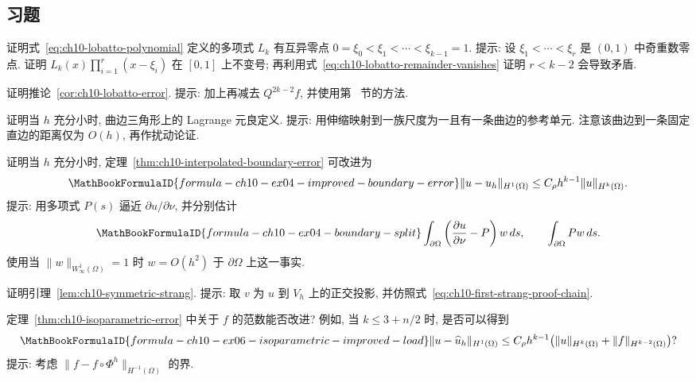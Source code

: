 \subsection{习题}
\label{sec:ch10-exercises}
\setcounter{exerciseitem}{0}

\begin{MBExercise}
\label{exr:ch10-01}
证明式~\eqref{eq:ch10-lobatto-polynomial} 定义的多项式 $L_k$ 有互异零点 $0=\xi_0<\xi_1<\cdots<\xi_{k-1}=1$. 提示: 设 $\xi_1<\cdots<\xi_r$ 是 $(0,1)$ 中奇重数零点. 证明 $L_k(x)\prod_{i=1}^r(x-\xi_i)$ 在 $[0,1]$ 上不变号; 再利用式~\eqref{eq:ch10-lobatto-remainder-vanishes} 证明 $r<k-2$ 会导致矛盾.
\end{MBExercise}

\begin{MBExercise}
\label{exr:ch10-02}
证明推论~\ref{cor:ch10-lobatto-error}. 提示: 加上再减去 $Q^{2k-2}f$, 并使用第~ 节的方法.
\end{MBExercise}

\begin{MBExercise}
\label{exr:ch10-03}
证明当 $h$ 充分小时, 曲边三角形上的 Lagrange 元良定义. 提示: 用伸缩映射到一族尺度为一且有一条曲边的参考单元. 注意该曲边到一条固定直边的距离仅为 $O(h)$, 再作扰动论证.
\end{MBExercise}

\begin{MBExercise}
\label{exr:ch10-04}
证明当 $h$ 充分小时, 定理~\ref{thm:ch10-interpolated-boundary-error} 可改进为
\[
\MathBookFormulaID{formula-ch10-ex04-improved-boundary-error}
\|u-u_h\|_{H^1(\Omega)}\leq C_\rho h^{k-1}\|u\|_{H^k(\Omega)}.
\]
提示: 用多项式 $P(s)$ 逼近 $\partial u/\partial\nu$, 并分别估计
\[
\MathBookFormulaID{formula-ch10-ex04-boundary-split}
\int_{\partial\Omega}\left(\frac{\partial u}{\partial\nu}-P\right)w\,ds,
\qquad
\int_{\partial\Omega}Pw\,ds.
\]
使用当 $\|w\|_{W_\infty^1(\Omega)}=1$ 时 $w=O(h^2)$ 于 $\partial\Omega$ 上这一事实.
\end{MBExercise}

\begin{MBExercise}
\label{exr:ch10-05}
证明引理~\ref{lem:ch10-symmetric-strang}. 提示: 取 $v$ 为 $u$ 到 $V_h$ 上的正交投影, 并仿照式~\eqref{eq:ch10-first-strang-proof-chain}.
\end{MBExercise}

\begin{MBExercise}
\label{exr:ch10-06}
定理~\ref{thm:ch10-isoparametric-error} 中关于 $f$ 的范数能否改进? 例如, 当 $k\leq3+n/2$ 时, 是否可以得到
\[
\MathBookFormulaID{formula-ch10-ex06-isoparametric-improved-load}
\|u-\widehat u_h\|_{H^1(\Omega)}
\leq C_\rho h^{k-1}\bigl(\|u\|_{H^k(\Omega)}+\|f\|_{H^{k-2}(\Omega)}\bigr)?
\]
提示: 考虑 $\|f-f\circ\Phi^h\|_{H^{-1}(\Omega)}$ 的界.
\end{MBExercise}

